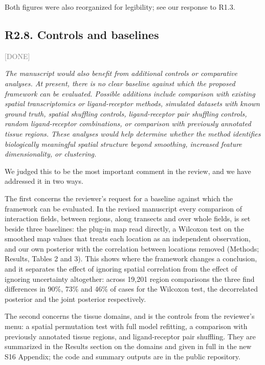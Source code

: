 \documentclass[11pt]{article}
\newcommand{\status}[1]{\textcolor{gray}{\small\textsf{[#1]}}}
\newenvironment{rev}{\begin{leftbar}\itshape\small}{\end{leftbar}}
\begin{document}
Both figures were also reorganized for legibility; see our response to R1.3.

\subsection{R2.8. Controls and baselines} \status{DONE}

\begin{rev}
The manuscript would also benefit from additional controls or comparative analyses. At
present, there is no clear baseline against which the proposed framework can be evaluated.
Possible additions include comparison with existing spatial transcriptomics or
ligand-receptor methods, simulated datasets with known ground truth, spatial shuffling
controls, ligand-receptor pair shuffling controls, random ligand-receptor combinations, or
comparison with previously annotated tissue regions. These analyses would help determine
whether the method identifies biologically meaningful spatial structure beyond smoothing,
increased feature dimensionality, or clustering.
\end{rev}

\noindent We judged this to be the most important comment in the review, and we have addressed it in
two ways.

The first concerns the reviewer's request for a baseline against which the framework can be
evaluated. In the revised manuscript every comparison of interaction fields, between regions,
along transects and over whole fields, is set beside three baselines: the plug-in map read
directly, a Wilcoxon test on the smoothed map values that treats each location as an independent
observation, and our own posterior with the correlation between locations removed (Methods;
Results, Tables 2 and 3). This shows
where the framework changes a conclusion, and it separates the effect of ignoring spatial
correlation from the effect of ignoring uncertainty altogether: across 19,201 region comparisons
the three find differences in 90\%, 73\% and 46\% of cases for the Wilcoxon test, the
decorrelated posterior and the joint posterior respectively.

The second concerns the tissue domains, and is the controls from the reviewer's menu: a spatial
permutation test with full model refitting, a comparison with previously annotated tissue regions,
and ligand-receptor pair shuffling. They are summarized in the Results section on the domains and
given in full in the new S16 Appendix; the code and summary outputs are in the public repository.
\end{document}
